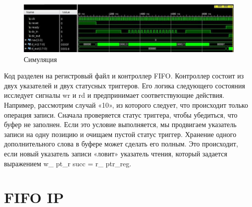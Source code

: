 



\begin{figure}[h]
\centering
\includegraphics[width=1.1\textwidth]{simulation}
\caption{Симуляция}
\label{simulation_label}
\end{figure}

Код разделен на регистровый файл и контроллер FIFO. Контроллер состоит из двух указателей и двух статусных триггеров. Его логика следующего состояния исследует сигналы wr и rd и предпринимает соответствующие действия. Например, рассмотрим случай «10», из которого следует, что происходит только операция записи. Сначала проверяется статус триггера, чтобы убедиться, что буфер не заполнен. Если это условие выполняется, мы продвигаем указатель записи на одну позицию и очищаем пустой статус триггер. Хранение одного дополнительного слова в буфере может сделать его полным. Это происходит, если новый указатель записи «ловит» указатель чтения, который задается выражением w\_ pt\_r succ = r\_ ptr\_reg.

\section{FIFO IP}

